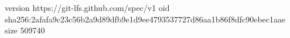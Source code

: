 version https://git-lfs.github.com/spec/v1
oid sha256:2afafa9c23c56b2a9d89dfb9e1d9ee4793537727d86aa1b86f8dfc90ebec1aae
size 509740
